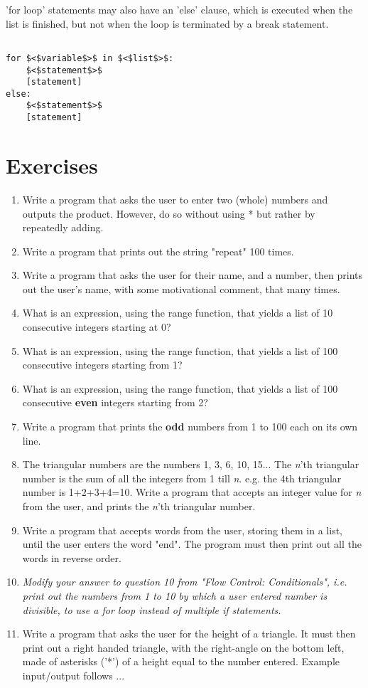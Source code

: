 'for loop' statements may also have an 'else' clause, which is   executed when the list is finished, but not when the loop is   terminated by a break statement.
\begin{lstlisting}

for $<$variable$>$ in $<$list$>$:
    $<$statement$>$
    [statement]
else:
    $<$statement$>$
    [statement]
\end{lstlisting}

\section{Exercises}
\begin{enumerate}
	\item Write a program that asks the user to enter two (whole) numbers and outputs the product. However, do so without using * but rather by repeatedly adding.
	\item Write a program that prints out the string "repeat" 100 times.
	\item Write a program that asks the user for their name, and a    number, then prints out the user's name, with some motivational comment, that many times.
	\item What is an expression, using the range function, that yields a    list of 10 consecutive integers starting at 0?
	\item What is an expression, using the range function, that yields a    list of 100 consecutive integers starting from 1?
	\item What is an expression, using the range function, that yields a    list of 100 consecutive \textbf{even} integers starting    from 2?
	\item Write a program that prints the \textbf{odd} numbers from 1 to 100 each on    its own line.
	\item The triangular numbers are the numbers 1, 3, 6, 10, 15... The \textit{n}'th triangular number is the sum of all the integers from 1 till \textit{n}. e.g. the 4th triangular number is 1+2+3+4=10. Write a program that accepts an integer value for \textit{n} from the user, and prints the \textit{n}'th triangular number.
	\item Write a program that accepts words from the user, storing them in a list, until the user enters the word "end". The program must then print out all the words in reverse order.
	\item \textit{Modify your answer to question 10 from "Flow Control:    Conditionals", i.e. print out the numbers from 1 to 10 by which a    user entered number is divisible, to use a for loop instead of    multiple if statements.}
	\item Write a program that asks the user for the height of a triangle.    It must then print out a right handed triangle, with the right-angle on the    bottom left, made of asterisks ('*') of a height equal to the    number entered. Example input/output follows ...      
\begin{lstlisting}


\end{lstlisting}
\end{enumerate}
